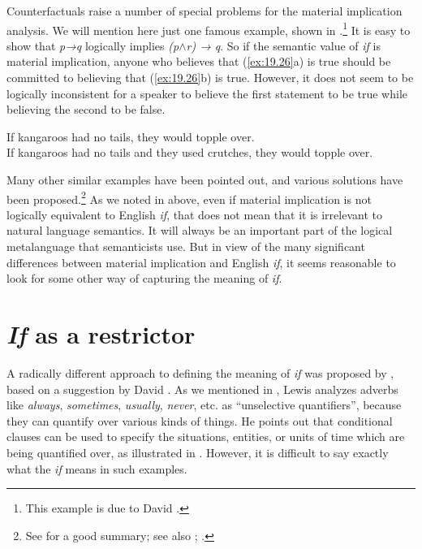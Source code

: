 Counterfactuals raise a number of special problems for the material implication analysis. We will mention here just one famous example, shown in .\footnote{This example is due to David \citet{Lewis1973a}.} It is easy to show that \textit{p→q} logically implies \textit{(p}$\wedge$\textit{r) → q}. So if the semantic value of \textit{if} is material implication, anyone who believes that (\ref{ex:19.26}a) is true should be committed to believing that (\ref{ex:19.26}b) is true. However, it does not seem to be logically inconsistent for a speaker to believe the first statement to be true while believing the second to be false.


\ea \label{ex:19.26}
\ea  If kangaroos had no tails, they would topple over.\\
\ex If kangaroos had no tails and they used crutches, they would topple over.
                       \z
\z


Many other similar examples have been pointed out, and various solutions have been proposed.\footnote{See  for a good summary; see also \citet[83-87]{Gazdar1979}; \citet[ch2--3]{Bennett2003}.} As we noted in  above, even if material implication is not logically equivalent to English \textit{if}, that does not mean that it is irrelevant to natural language semantics. It will always be an important part of the logical metalanguage that semanticists use. But in view of the many significant differences between material implication and English \textit{if}, it seems reasonable to look for some other way of capturing the meaning of \textit{if}.


\section{\textit{If} as a restrictor}\label{sec:19.5}

A radically different approach to defining the meaning of \textit{if} was proposed by \citet{Kratzer1986}, based on a suggestion by David \citet{Lewis1975}. As we mentioned in , Lewis analyzes adverbs like \textit{always}, \textit{sometimes}, \textit{usually}, \textit{never}, etc. as “unselective quantifiers”, because they can quantify over various kinds of things. He points out that conditional clauses can be used to specify the situations, entities, or units of time which are being quantified over, as illustrated in . However, it is difficult to say exactly what the \textit{if} means in such examples.


